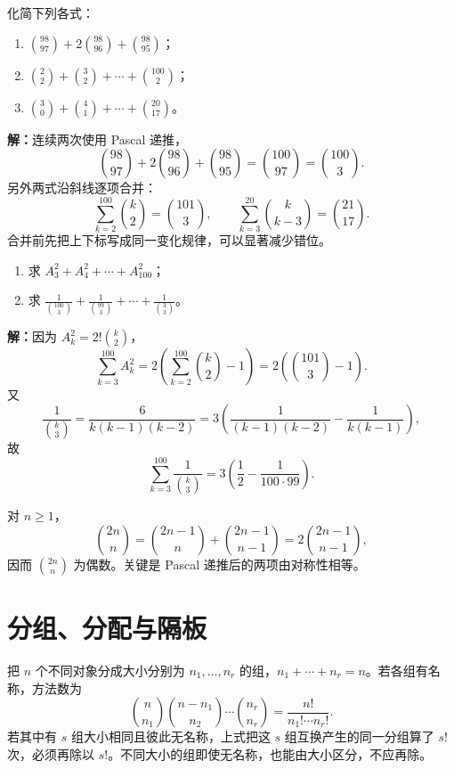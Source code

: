 \begin{examplebox}
  化简下列各式：
  \begin{enumerate}
    \item $\binom{98}{97}+2\binom{98}{96}+\binom{98}{95}$；
    \item $\binom22+\binom32+\cdots+\binom{100}2$；
    \item $\binom30+\binom41+\cdots+\binom{20}{17}$。
  \end{enumerate}

  \textbf{解：}连续两次使用 Pascal 递推，
  \[
    \binom{98}{97}+2\binom{98}{96}+\binom{98}{95}
    =\binom{100}{97}=\binom{100}3.
  \]
  另外两式沿斜线逐项合并：
  \[
    \sum_{k=2}^{100}\binom k2=\binom{101}3,
    \qquad
    \sum_{k=3}^{20}\binom{k}{k-3}=\binom{21}{17}.
  \]
  合并前先把上下标写成同一变化规律，可以显著减少错位。
\end{examplebox}

\begin{examplebox}
  \begin{enumerate}
    \item 求 $A_3^2+A_4^2+\cdots+A_{100}^2$；
    \item 求 $\displaystyle\frac1{\binom{100}3}+\frac1{\binom{99}3}+\cdots+\frac1{\binom33}$。
  \end{enumerate}

  \textbf{解：}因为 $A_k^2=2!\binom k2$，
  \[
    \sum_{k=3}^{100}A_k^2
    =2\left(\sum_{k=2}^{100}\binom k2-1\right)
    =2\left(\binom{101}3-1\right).
  \]
  又
  \[
    \frac1{\binom k3}=\frac{6}{k(k-1)(k-2)}
    =3\left(\frac1{(k-1)(k-2)}-\frac1{k(k-1)}\right),
  \]
  故
  \[
    \sum_{k=3}^{100}\frac1{\binom k3}
    =3\left(\frac12-\frac1{100\cdot99}\right).
  \]
\end{examplebox}

\begin{corollarybox}[中央组合数是偶数]
  对 $n\ge1$，
  \[
    \binom{2n}{n}
    =\binom{2n-1}{n}+\binom{2n-1}{n-1}
    =2\binom{2n-1}{n-1},
  \]
  因而 $\binom{2n}{n}$ 为偶数。关键是 Pascal 递推后的两项由对称性相等。
\end{corollarybox}

\section{分组、分配与隔板}

\begin{corollarybox}
  把 $n$ 个不同对象分成大小分别为 $n_1,\ldots,n_r$ 的组，$n_1+\cdots+n_r=n$。若各组有名称，方法数为
  \[
    \binom n{n_1}\binom{n-n_1}{n_2}\cdots\binom{n_r}{n_r}
    =\frac{n!}{n_1!\cdots n_r!}.
  \]
  若其中有 $s$ 组大小相同且彼此无名称，上式把这 $s$ 组互换产生的同一分组算了 $s!$ 次，必须再除以 $s!$。不同大小的组即使无名称，也能由大小区分，不应再除。
\end{corollarybox}

